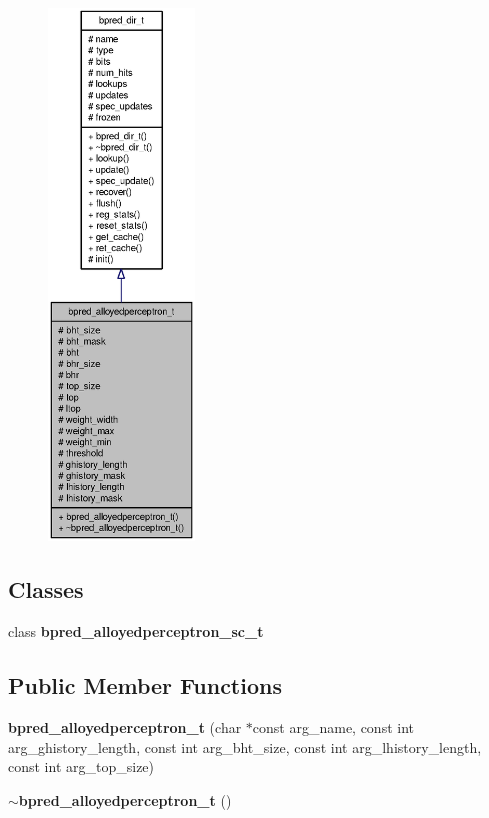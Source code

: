 \begin{figure}[H]
\begin{center}
\leavevmode
\includegraphics[height=400pt]{classbpred__alloyedperceptron__t__coll__graph}
\end{center}
\end{figure}
\subsection*{Classes}
\begin{CompactItemize}
\item 
class {\bf bpred\_\-alloyedperceptron\_\-sc\_\-t}
\end{CompactItemize}
\subsection*{Public Member Functions}
\begin{CompactItemize}
\item 
{\bf bpred\_\-alloyedperceptron\_\-t} (char $\ast$const arg\_\-name, const int arg\_\-ghistory\_\-length, const int arg\_\-bht\_\-size, const int arg\_\-lhistory\_\-length, const int arg\_\-top\_\-size)
\item 
{\bf $\sim$bpred\_\-alloyedperceptron\_\-t} ()
\end{CompactItemize}
